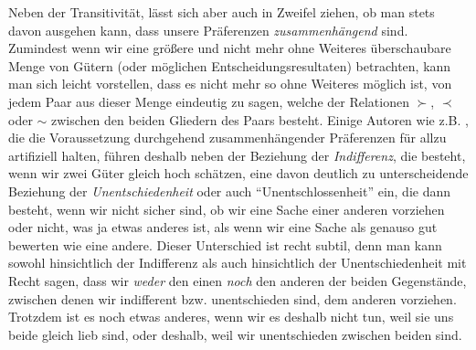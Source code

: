 Neben der Transitivität, lässt sich aber auch in Zweifel ziehen, ob man stets
davon ausgehen kann, dass unsere Präferenzen {\em zusammenhängend} sind.
Zumindest wenn wir eine größere und nicht mehr ohne Weiteres überschaubare Menge
von Gütern (oder möglichen Entscheidungsresultaten) betrachten, kann man sich
leicht vorstellen, dass es nicht mehr so ohne Weiteres möglich ist, von jedem
Paar aus dieser Menge eindeutig zu sagen, welche der Relationen $\succ$, $\prec$
oder $\sim$ zwischen den beiden Gliedern des Paars besteht. Einige Autoren wie
z.B. \cite{kaplan:1996}, die die Voraussetzung durchgehend zusammenhängender
Präferenzen für allzu artifiziell halten, führen deshalb neben der Beziehung der
{\em Indifferenz}, die besteht, wenn wir zwei Güter gleich hoch schätzen,
eine davon deutlich zu unterscheidende Beziehung der {\em Unentschiedenheit} oder
auch "`Unentschlossenheit"' ein, die dann besteht, wenn wir nicht sicher sind, ob
wir eine Sache einer anderen vorziehen oder nicht, was ja etwas anderes ist, als
wenn wir eine Sache als genauso gut bewerten wie eine andere.
 Dieser Unterschied
ist recht subtil, denn man kann sowohl hinsichtlich der Indifferenz als auch
hinsichtlich der Unentschiedenheit mit Recht sagen, dass wir {\em weder} den
einen {\em noch} den anderen der beiden Gegenstände, zwischen denen wir
indifferent bzw. unentschieden sind, dem anderen vorziehen. Trotzdem ist es noch
etwas anderes, wenn wir es deshalb nicht tun, weil sie uns beide gleich lieb
sind, oder deshalb, weil wir unentschieden zwischen beiden sind.

